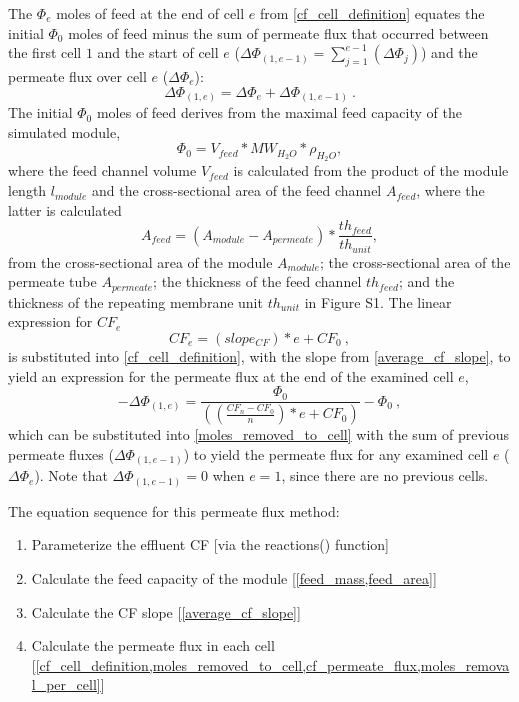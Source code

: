 The $\Phi_e$ moles of feed at the end of cell $e$ from \cref{cf_cell_definition} equates the initial $\Phi_0$ moles of feed minus the sum of permeate flux that occurred between the first cell $1$ and the start of cell $e$ ($\Delta \Phi_{(1,e-1)}=\sum_{j=1}^{e-1}(\Delta \Phi_{j})$) and the permeate flux over cell $e$ ($\Delta \Phi_{e}$):
\begin{equation} \label{moles_removed_to_cell}
    \Delta \Phi_{(1,e)}=\Delta \Phi_{e}+\Delta \Phi_{(1,e-1)}~.
\end{equation}
The initial $\Phi_0$ moles of feed derives from the maximal feed capacity of the simulated module,
\begin{equation} \label{feed_mass}
    \Phi_0=V_{feed}*MW_{H_2O}*\rho_{H_2O},
\end{equation}
where the feed channel volume $V_{feed}$ is calculated from the product of the module length $l_{module}$ and the cross-sectional area of the feed channel $A_{feed}$, where the latter is calculated
\begin{equation} \label{feed_area}
    A_{feed}=(A_{module}-A_{permeate})*\frac{th_{feed}}{th_{unit}},
\end{equation}
from the cross-sectional area of the module $A_{module}$; the cross-sectional area of the permeate tube $A_{permeate}$; the thickness of the feed channel $th_{feed}$; and the thickness of the repeating membrane unit $th_{unit}$ in Figure S1.
The linear expression for $CF_e$ 
\begin{equation} \label{cf_permeate_flux}
    CF_e=(slope_{CF})*e+CF_{0}~,
\end{equation}
is substituted into \cref{cf_cell_definition}, with the slope from \cref{average_cf_slope}, to yield an expression for the permeate flux at the end of the examined cell $e$,
\begin{equation} \label{moles_removal_per_cell} 
    -\Delta \Phi_{(1,e)}=\frac{\Phi_0}{((\frac{CF_{n}-CF_{0}}{n})*e+CF_{0})}-\Phi_0~,
\end{equation}
which can be substituted into \cref{moles_removed_to_cell} with the sum of previous permeate fluxes ($\Delta \Phi_{(1,e-1)}$) to yield the permeate flux for any examined cell $e$ ($\Delta \Phi_{e}$). Note that $\Delta \Phi_{(1,e-1)}=0$ when $e=1$, since there are no previous cells. 

The equation sequence for this permeate flux method:
\begin{enumerate}
    \item Parameterize the effluent CF [via the reactions() function]
    \item Calculate the feed capacity of the module [\cref{feed_mass,feed_area}]
    \item Calculate the CF slope [\cref{average_cf_slope}]
    \item Calculate the permeate flux in each cell [\cref{cf_cell_definition,moles_removed_to_cell,cf_permeate_flux,moles_removal_per_cell}]
\end{enumerate}



